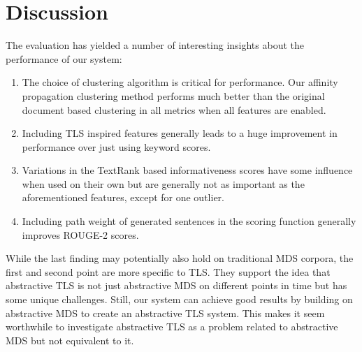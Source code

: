 \documentclass[a4paper,BCOR=10mm]{report}
\numberwithin{lemma}{chapter}
\numberwithin{definition}{chapter}
\begin{document}
%

\section{Discussion}

The evaluation has yielded a number of interesting insights about the performance of our system:

\begin{enumerate}
    \item{The choice of clustering algorithm is critical for performance. Our affinity propagation clustering method performs much better than the original document based clustering in all metrics when all features are enabled.}
    \item{Including TLS inspired features generally leads to a huge improvement in performance over just using keyword scores.}
    \item{Variations in the TextRank based informativeness scores have some influence when used on their own but are generally not as important as the aforementioned features, except for one outlier.}
    \item{Including path weight of generated sentences in the scoring function generally improves ROUGE-2 scores.}
\end{enumerate}

While the last finding may potentially also hold on traditional MDS corpora, the first and second point are more specific to TLS.
They support the idea that abstractive TLS is not just abstractive MDS on different points in time but has some unique challenges.
Still, our system can achieve good results by building on abstractive MDS to create an abstractive TLS system.
This makes it seem worthwhile to investigate abstractive TLS as a problem related to abstractive MDS but not equivalent to it.
\end{document}

